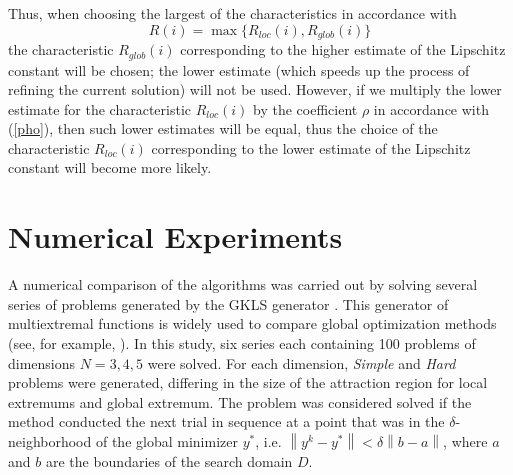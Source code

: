 \documentclass[runningheads]{llncs}
\begin{document}
Thus, when choosing the largest of the characteristics in accordance with
\[
R(i) = \max\{R_{loc}(i),R_{glob}(i)\}
\]
the characteristic $R_{glob}(i)$ corresponding to the higher estimate of the Lipschitz constant will be chosen; the lower estimate (which speeds up the process of refining the current solution) will not be used.
However, if we multiply the lower estimate for the characteristic $R_{loc}(i)$ by the coefficient $\rho$ in accordance with (\ref{pho}), then such lower estimates will be equal, 
thus the choice of the characteristic $R_{loc}(i)$ corresponding to the lower estimate of the Lipschitz constant will become more likely.


\section{Numerical Experiments}

A numerical comparison of the algorithms was carried out by solving several series of problems generated by the GKLS generator \cite{Gaviano2003}. This generator of multiextremal functions is widely used to compare global optimization methods (see, for example, \cite{Barkalov2018,Paulavicius2014,Sergeyev2015}). In this study, six series each containing 100 problems of dimensions $N = 3,4,5$ were solved. For each dimension, \textit{Simple} and \textit{Hard} problems were generated, differing in the size of the attraction region for local extremums and global extremum.
The problem was considered solved if the method conducted the next trial in sequence at a point that was in the $\delta$-neighborhood of the global minimizer $y^\ast$, 
i.e. $\left\|y^k-y^\ast\right\| <\delta\left\|b-a\right\|$, where  $a$ and $b$ are the boundaries of the search domain $D$.

\end{document}
